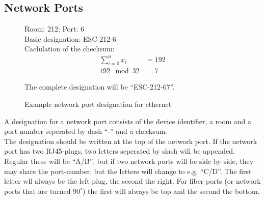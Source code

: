 %
%
%
%
%
%
%

\subsection{Network Ports}
\label{chap:spec_netport}

\begin{wrapfigure}{r}{0.35\textwidth}
	Room: 212; Port: 6 \\
	Basic designation: ESC-212-6 \\

	Caclulation of the checksum:
	\begin{align*}
		\sum_{i=0}^{n} x_i &= 192 \\
		192 \mod 32 &= 7
	\end{align*}

	The complete designation will be ``ESC-212-67''.

	\caption{Example network port designation for ethernet}
\end{wrapfigure}

A designation for a network port consists of the device identifier, a room and a
port number seperated by dash ``-'' and a checksum. \\

The designation should be written at the top of the network port. If the
network port has two RJ45-plugs, two letters seperated by slash will be
appended. Regular these will be ``A/B'', but if two network ports will be side
by side, they may share the port-number, but the letters will change to e.g.
``C/D''. The first letter wll always be the left plug, the second the right. For
fiber ports (or network ports that are turned $90^{\circ}$) the first will
always be top and the second the bottom. \\

